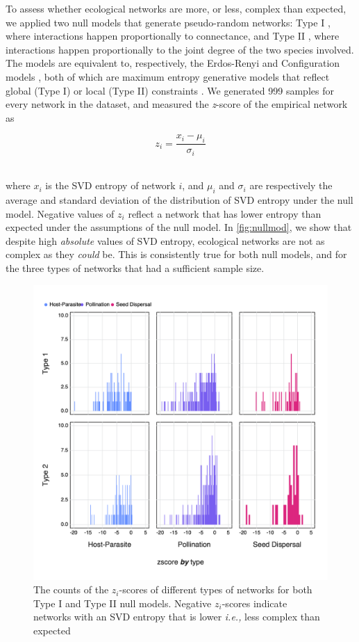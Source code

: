 To assess whether ecological networks are more, or less, complex than expected,
we applied two null models that generate pseudo-random networks: Type I
\cite{Fortuna2006HabLos}, where interactions happen proportionally to
connectance, and Type II \cite{Bascompte2003NesAss}, where interactions happen
proportionally to the joint degree of the two species involved. The models are
equivalent to, respectively, the Erdos-Renyi and Configuration models
\cite{Newman2010NetInt}, both of which are maximum entropy generative models
that reflect global (Type I) or local (Type II) constraints
\cite{Park2004StaMec}. We generated 999 samples for every network in the
dataset, and measured the \emph{z}-score of the empirical network as

\[z_i = \frac{x_i-\mu_i}{\sigma_i}\]\

where \(x_i\) is the SVD entropy of network \(i\), and \(\mu_i\) and
\(\sigma_i\) are respectively the average and standard deviation of the
distribution of SVD entropy under the null model. Negative values of \(z_i\)
reflect a network that has lower entropy than expected under the assumptions of
the null model. In \autoref{fig:nullmod}, we show that despite high
\emph{absolute} values of SVD entropy, ecological networks are not as complex as
they \emph{could} be. This is consistently true for both null models, and for
the three types of networks that had a sufficient sample size.

\begin{figure}[h]
    \centering
    \includegraphics[width=\textwidth]{figures/nullmodel_histogram.png}
    \caption{The counts of the \(z_i\)-scores of different types of networks for
both Type I and Type II null models. Negative \(z_i\)-scores indicate networks
with an SVD entropy that is lower \emph{i.e.,} less complex than expected}
    \label{fig:nullmod}
\end{figure}

